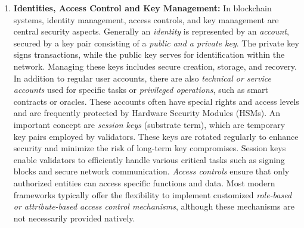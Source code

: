 \begin{enumerate}[label=(\arabic*)]

	\item\textbf{Identities, Access Control and Key Management:}\cite{nist_pub_key_mgmt}\cite{sub_acc_add_key}\cite{nist_pub_bloc_acc_ctrl}\cite{hype_dkms}
	In blockchain systems, identity management, access controls, and key management are central security aspects. 
	Generally an \textit{identity} is represented by an \textit{account}, secured by a key pair consisting of a \textit{public and a private key}. The private key signs transactions, while the public key serves for identification within the network. Managing these keys includes secure creation, storage, and recovery.
	In addition to regular user accounts, there are also \textit{technical or service accounts} used for specific tasks or \textit{privileged operations}, such as smart contracts or oracles. These accounts often have special rights and access levels and are frequently protected by Hardware Security Modules (HSMs).
	An important concept are \textit{session keys} (substrate term), which are temporary key pairs employed by validators. These keys are rotated regularly to enhance security and minimize the risk of long-term key compromises. Session keys enable validators to efficiently handle various critical tasks such as signing blocks and secure network communication. 
	\textit{Access controls} ensure that only authorized entities can access specific functions and data. Most modern frameworks typically offer the flexibility to implement customized \textit{role-based or attribute-based access control mechanisms}, although these mechanisms are not necessarily provided natively. 


\end{enumerate}
